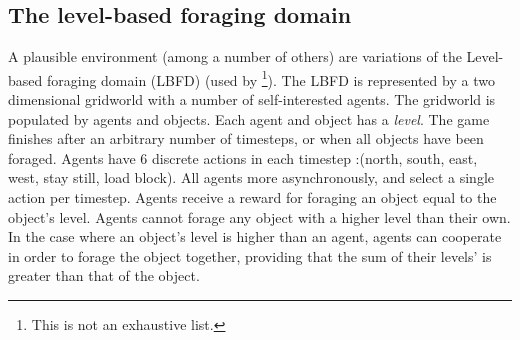 \subsection{The level-based foraging domain}
A plausible environment (among a number of others) are variations of the Level-based foraging domain (LBFD) (used by \cite{Albrecht2019,Barrett2015,Hayashi_et_al2020,Papoudakis2020}\footnote{This is not an exhaustive list.}). The LBFD is represented by a two dimensional gridworld with a number of self-interested agents.
The gridworld is populated by agents and objects. Each agent and object has a \textit{level}. The game finishes after an arbitrary number of timesteps, or when all objects have been foraged. Agents have 6 discrete actions in each timestep :(north, south, east, west, stay still, load block). All agents more asynchronously, and select a single action per timestep. Agents receive a reward for foraging an object equal to the object's level. Agents cannot forage any object with a higher level than their own. In the case where an object's level is higher than an agent, agents can cooperate in order to forage the object together, providing that the sum of their levels' is greater than that of the object.  
